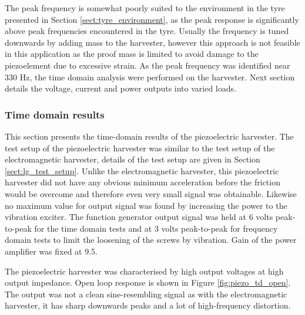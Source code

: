 The peak frequency is somewhat poorly suited to the environment in the tyre presented in Section \ref{sect:tyre_environment}, as the peak response is significantly above peak frequencies encountered in the tyre. Usually the frequency is tuned downwards by adding mass to the harvester, however this approach is not feasible in this application as the proof mass is limited to avoid damage to the piezoelement due to excessive strain. As the peak frequency was identified near 330 Hz, the time domain analysis were performed on the harvester. Next section details the voltage, current and power outputs into varied loads.

\subsubsection{Time domain results}
This section presents the time-domain results of the piezoelectric harvester. The test setup of the piezoelectric harvester was similar to the test setup of the electromagnetic harvester, details of the test setup are given in Section \ref{sect:lg_test_setup}. Unlike the electromagnetic harvester, this piezoelectric harvester did not have any obvious minimum acceleration before the friction would be overcome and therefore even very small signal was obtainable. Likewise no maximum value for output signal was found by increasing the power to the vibration exciter. The function generator output signal was held at 6 volts peak-to-peak for the time domain tests and at 3 volts peak-to-peak for frequency domain tests to limit the loosening of the screws by vibration. Gain of the power amplifier was fixed at 9.5.

The piezoelectric harvester was characterised by high output voltages at high output impedance. Open loop response is shown in Figure \ref{fig:piezo_td_open}. The output was not a clean sine-resembling signal as with the electromagnetic harvester, it has sharp downwards peaks and a lot of high-frequency distortion.


